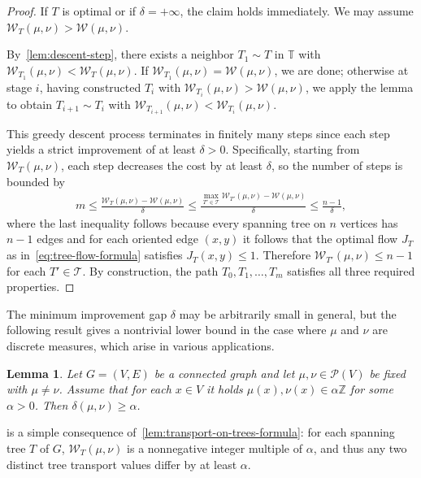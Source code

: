 \documentclass[11pt,a4paper]{article}
\newcommand{\prob}{{\mathscr{P}}}
\newcommand{\wass}{{\mathcal{W}}}
\newcommand{\setoftrees}{{\mathcal{T}}}
\newcommand{\stategraph}{{\mathbb{T}}}
\newtheorem{lemma}[theorem]{Lemma}
\begin{document}
\begin{proof}
    If $T$ is optimal or if $\delta = +\infty$, the claim holds immediately. We may assume $\wass_{T}(\mu,\nu) > \wass(\mu,\nu)$. 
    
    By~\cref{lem:descent-step}, there exists a neighbor $T_1\sim T$ in $\stategraph$ with $\wass_{T_1}(\mu,\nu) < \wass_{T}(\mu,\nu)$. If $\wass_{T_1}(\mu,\nu)=\wass(\mu,\nu)$, we are done; otherwise at stage $i$, having constructed $T_i$ with $\wass_{T_i}(\mu,\nu) > \wass(\mu,\nu)$, we apply the lemma to obtain $T_{i+1}\sim T_i$ with $\wass_{T_{i+1}}(\mu,\nu) < \wass_{T_i}(\mu,\nu)$.

    This greedy descent process terminates in finitely many steps since each step yields a strict improvement of at least $\delta > 0$. Specifically, starting from $\wass_{T}(\mu,\nu)$, each step decreases the cost by at least $\delta$, so the number of steps is bounded by
        \begin{align*}
            m \leq \frac{\wass_{T}(\mu,\nu) - \wass(\mu,\nu)}{\delta} \leq \frac{\max_{T'\in\setoftrees} \wass_{T'}(\mu,\nu) - \wass(\mu,\nu)}{\delta} \leq \frac{n-1}{\delta},
        \end{align*}
    where the last inequality follows because every spanning tree on $n$ vertices has $n-1$ edges and for each oriented edge $(x,y)$ it follows that the optimal flow $J_{T}$ as in~\cref{eq:tree-flow-formula} satisfies $J_T(x,y)\le 1$. Therefore $\wass_{T'}(\mu,\nu)\le n-1$ for each $T'\in\setoftrees$. By construction, the path $T_0, T_1, \dotsc, T_m$ satisfies all three required properties.
\end{proof}

The minimum improvement gap $\delta$ may be arbitrarily small in general, but the following result gives a nontrivial lower bound in the case where $\mu$ and $\nu$ are discrete measures, which arise in various applications.

\begin{lemma}\label{lem:rational-measures-gap}
    Let $G=(V,E)$ be a connected graph and let $\mu,\nu\in\prob(V)$ be fixed with $\mu\ne \nu$. Assume that for each $x\in V$ it holds $\mu(x),\nu(x) \in \alpha\mathbb{Z}$ for some $\alpha > 0$. Then $\delta(\mu,\nu) \geq \alpha$.
\end{lemma}

 is a simple consequence of~\cref{lem:transport-on-trees-formula}: for each spanning tree $T$ of $G$, $\wass_T(\mu,\nu)$ is a nonnegative integer multiple of $\alpha$, and thus any two distinct tree transport values differ by at least $\alpha$. 
\end{document}
